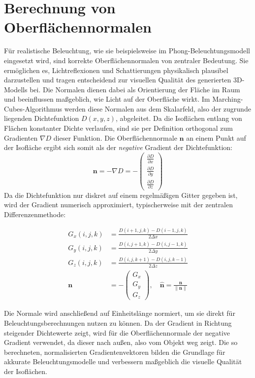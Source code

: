 \documentclass[12pt]{article}
\begin{document}
\section{Berechnung von Oberflächennormalen}
Für realistische Beleuchtung, wie sie beispielsweise im Phong-Beleuchtungsmodell eingesetzt wird, sind korrekte Oberflächennormalen von zentraler Bedeutung.
Sie ermöglichen es, Lichtreflexionen und Schattierungen physikalisch plausibel darzustellen und tragen entscheidend zur visuellen Qualität des generierten 3D-Modells bei.
Die Normalen dienen dabei als Orientierung der Fläche im Raum und beeinflussen maßgeblich, wie Licht auf der Oberfläche wirkt.
Im Marching-Cubes-Algorithmus werden diese Normalen aus dem Skalarfeld, also der zugrunde liegenden Dichtefunktion $D(x,y,z)$, abgeleitet.
Da die Isoflächen entlang von Flächen konstanter Dichte verlaufen, sind sie per Definition orthogonal zum Gradienten $\nabla D$ dieser Funktion.
Die Oberflächennormale $\mathbf{n}$ an einem Punkt auf der Isofläche ergibt sich somit als der \emph{negative} Gradient der Dichtefunktion:
\[
\mathbf{n} = - \nabla D = -
\begin{pmatrix}
\frac{\partial D}{\partial x} \\[8pt]
\frac{\partial D}{\partial y} \\[8pt]
\frac{\partial D}{\partial z}
\end{pmatrix}
\]
Da die Dichtefunktion nur diskret auf einem regelmäßigen Gitter gegeben ist, wird der Gradient numerisch approximiert, typischerweise mit der zentralen Differenzenmethode:
\begin{center}
\begin{align*}
  G_x(i,j,k) &= \frac{D(i+1, j, k) - D(i-1, j, k)}{2 \Delta x} \\
  G_y(i,j,k) &= \frac{D(i, j+1, k) - D(i, j-1, k)}{2 \Delta y} \\
  G_z(i,j,k) &= \frac{D(i, j, k+1) - D(i, j, k-1)}{2 \Delta z} \\
  \mathbf{n} &= - \begin{pmatrix} G_x \\ G_y \\ G_z \end{pmatrix}, \quad
  \hat{\mathbf{n}} = \frac{\mathbf{n}}{\|\mathbf{n}\|}
\end{align*}
\end{center}
Die Normale wird anschließend auf Einheitslänge normiert, um sie direkt für Beleuchtungsberechnungen nutzen zu können.
Da der Gradient in Richtung steigender Dichtewerte zeigt, wird für die Oberflächennormale der negative Gradient verwendet, da dieser nach außen, also vom Objekt weg zeigt.
Die so berechneten, normalisierten Gradientenvektoren bilden die Grundlage für akkurate Beleuchtungsmodelle und verbessern maßgeblich die visuelle Qualität der Isoflächen.
\newpage
\end{document}
